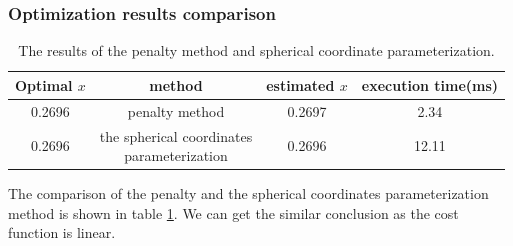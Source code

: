 \documentclass[a4paper,12pt]{article}
\begin{document}
\subsubsection{Optimization results comparison}


\begin{table}[!ht]
\begin{center}
\begin{tabular}{|c|c|c|c|}
\hline
Optimal $x$& method & estimated $x$&execution time(ms)\\
\hline
0.2696& penalty method&0.2697&2.34\\
\hline
0.2696&  \makecell{ the spherical coordinates \\parameterization}&0.2696&12.11\\

\hline
\end{tabular}
\end{center}
\caption{The results of the penalty method and spherical coordinate parameterization.}
\label{tab:poly}
\end{table}


The comparison of the penalty and the spherical coordinates parameterization method is shown in table \ref{tab:poly}. We can get the similar conclusion as the cost function is linear. \\




  
 
\end{document}
